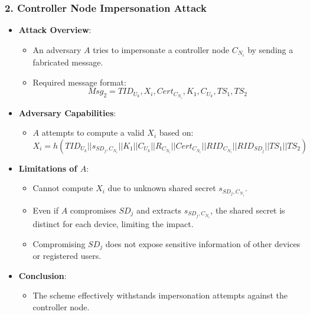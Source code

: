 \documentclass[9pt,handout]{beamer}
\begin{document}
\begin{frame}
    \frametitle{2. Controller Node Impersonation Attack}
    \begin{itemize}
        \item \textbf{Attack Overview}:
            \begin{itemize}
                \item An adversary \( A \) tries to impersonate a controller node \( C_{N_i} \) by sending a fabricated message.
                \item Required message format:
                \[
                Msg_2 = TID_{U_k}, X_i, Cert_{C_{N_i}}, K_1, C_{U_k}, TS_1, TS_2
                \]
            \end{itemize}
        \item \textbf{Adversary Capabilities}:
            \begin{itemize}
                \item \( A \) attempts to compute a valid \( X_i \) based on:
                \[
                X_i = h(TID_{U_k} || s_{SD_j,C_{N_i}} || K_1 || C_{U_k} || R_{C_{N_i}} || Cert_{C_{N_i}} || RID_{C_{N_i}} || RID_{SD_j} || TS_1 || TS_2)
                \]
            \end{itemize}
        \item \textbf{Limitations of \( A \)}:
            \begin{itemize}
                \item Cannot compute \( X_i \) due to unknown shared secret \( s_{SD_j,C_{N_i}} \).
                \item Even if \( A \) compromises \( SD_j \) and extracts \( s_{SD_j,C_{N_i}} \), the shared secret is distinct for each device, limiting the impact.
                \item Compromising \( SD_j \) does not expose sensitive information of other devices or registered users.
            \end{itemize}
        \item \textbf{Conclusion}:
            \begin{itemize}
                \item The scheme effectively withstands impersonation attempts against the controller node.
            \end{itemize}
    \end{itemize}
\end{frame}
\end{document}

